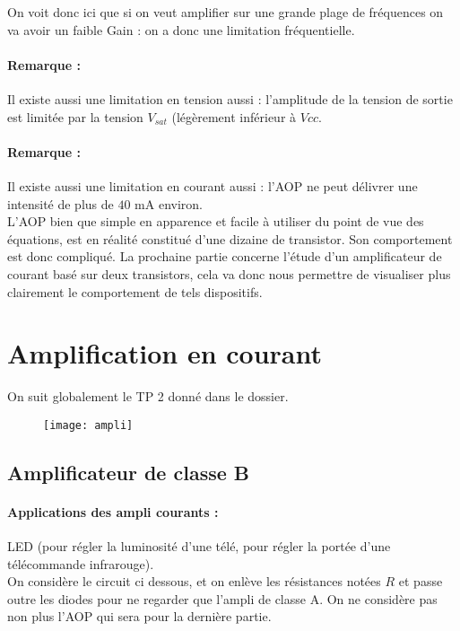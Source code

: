 \documentclass[12pt,prb,aps,epsf]{article}
\begin{document}
On voit donc ici que si on veut amplifier sur une grande plage de fréquences on va avoir un faible Gain : on a donc une limitation fréquentielle.

\paragraph{Remarque :} Il existe aussi une limitation en tension aussi : l'amplitude de la tension de sortie est limitée par la tension $V_{sat}$ (légèrement inférieur à $Vcc$.\\

\paragraph{Remarque :}Il existe aussi une limitation en courant aussi : l'AOP ne peut délivrer une intensité de plus de $40$ mA environ.\\

L'AOP bien que simple en apparence et facile à utiliser du point de vue des équations, est en réalité constitué d'une dizaine de transistor. Son comportement est donc compliqué. La prochaine partie concerne l'étude d'un amplificateur de courant basé sur deux transistors, cela va donc nous permettre de visualiser plus clairement le comportement de tels dispositifs.

\section{Amplification en courant}
On suit globalement le TP 2 donné dans le dossier.
\begin{figure}[h]
	\centering \texttt{[image: ampli]}
\end{figure}

\subsection{Amplificateur de classe B}
\paragraph{Applications des ampli courants :} LED (pour régler la luminosité d'une télé, pour régler la portée d'une télécommande infrarouge).\\

On considère le circuit ci dessous, et on enlève les résistances notées $R$ et passe outre les diodes pour ne regarder que l'ampli de classe A. On ne considère pas non plus l'AOP qui sera pour la dernière partie. \\
\end{document}
